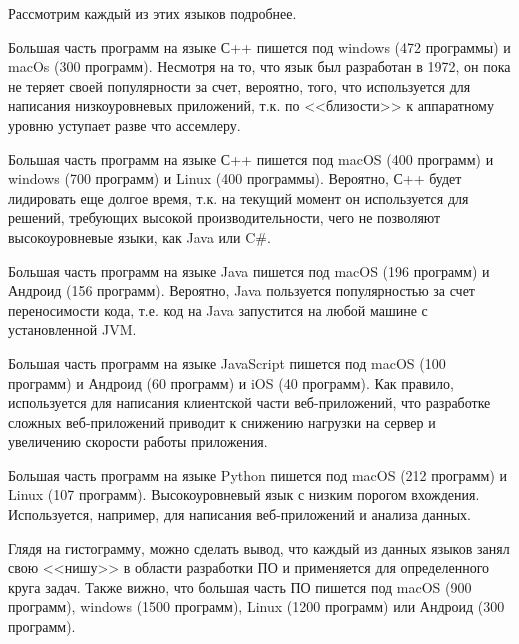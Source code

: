 Рассмотрим каждый из этих языков подробнее.

Большая часть программ на языке С++ пишется под windows (472 программы) и macOs (300 программ). Несмотря на то, что язык был разработан в 1972, он пока не теряет своей популярности за счет, вероятно, того, что используется для написания низкоуровневых приложений, т.к. по <<близости>> к аппаратному уровню уступает разве что ассемлеру.

Большая часть программ на языке С++ пишется под macOS (400 программ) и windows (700 программ) и Linux (400 программы). Вероятно, С++ будет лидировать еще долгое время, т.к. на текущий момент он используется для решений, требующих высокой производительности, чего не позволяют высокоуровневые языки, как Java или C\#.

Большая часть программ на языке Java пишется под macOS (196 программ) и Андроид (156 программ). Вероятно, Java пользуется популярностью за счет переносимости кода, т.е. код на Java запустится на любой машине с установленной JVM.

Большая часть программ на языке JavaScript пишется под macOS (100 программ) и Андроид (60 программ) и iOS (40 программ). Как правило, используется для написания клиентской части веб-приложений, что разработке сложных веб-приложений приводит к снижению нагрузки на сервер и увеличению скорости работы приложения.

Большая часть программ на языке Python пишется под macOS (212 программ) и Linux (107 программ). Высокоуровневый язык с низким порогом вхождения. Используется, например, для написания веб-приложений и анализа данных.

Глядя на гистограмму, можно сделать вывод, что каждый из данных языков занял свою <<нишу>> в области разработки ПО и применяется для определенного круга задач. Также вижно, что большая часть ПО пишется под macOS (900 программ), windows (1500 программ), Linux (1200 программ) или Андроид (300 программ).